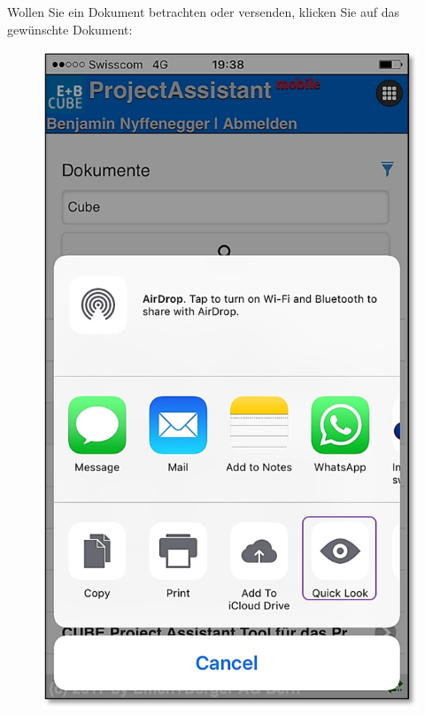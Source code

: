 \vspace{4cm}

Wollen Sie ein Dokument betrachten oder versenden, klicken Sie auf das gewünschte Dokument:

\pagebreak

\begin{figure}   %
  \vspace{-35pt}      %
  \begin{center}
    \includegraphics[width=1\linewidth]{../chapters/11_Dokumentenablage/pictures/11-mob06_Dokumente_anschauen.jpg}
  \end{center}
  \vspace{-20pt}
  \vspace{-10pt}
\end{figure}

